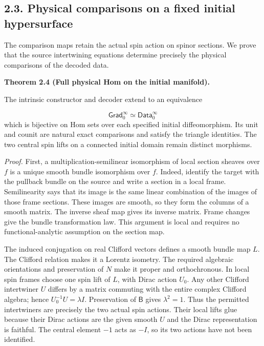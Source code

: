 \documentclass[
  english,
  11pt,
  reqno]{amsart}
\makeatletter
\newcommand{\pandocstatementheading}[1]{%
  \par\addpenalty{\@beginparpenalty}%
  \addvspace{.5\baselineskip plus .2\baselineskip minus .2\baselineskip}%
  {\normalfont\bfseries #1\par}%
  \nobreak\@afterindenttrue\@afterheading
}
\makeatother
\begin{document}
\subsection{2.3. Physical comparisons on a fixed initial
hypersurface}\label{physical-comparisons-on-a-fixed-initial-hypersurface}\label{sec:online-initial-physical-comparisons}

The comparison maps retain the actual spin action on spinor sections. We
prove that the source intertwining equations determine precisely the
physical comparisons of the decoded data.

\pandocstatementheading{\leavevmode{}\label{thm:online-initial-gradient-full-hom}Theorem 2.4 (Full physical Hom on the initial manifold).}

The intrinsic constructor and decoder extend to an equivalence

\label{eq:online-intrinsic-initial-equivalence} \[
\mathsf{Grad}_0^\infty\simeq\mathsf{Data}_0^\infty
\] which is bijective on Hom sets over each specified initial
diffeomorphism. Its unit and counit are natural exact comparisons and
satisfy the triangle identities. The two central spin lifts on a
connected initial domain remain distinct morphisms.

\emph{Proof.} First, a multiplication-semilinear isomorphism of local
section sheaves over \(f\) is a unique smooth bundle isomorphism over
\(f\). Indeed, identify the target with the pullback bundle on the
source and write a section in a local frame. Semilinearity says that its
image is the same linear combination of the images of those frame
sections. These images are smooth, so they form the columns of a smooth
matrix. The inverse sheaf map gives its inverse matrix. Frame changes
give the bundle transformation law. This argument is local and requires
no functional-analytic assumption on the section map.

The induced conjugation on real Clifford vectors defines a smooth bundle
map \(L\). The Clifford relation makes it a Lorentz isometry. The
required algebraic orientations and preservation of \(N\) make it proper
and orthochronous. In local spin frames choose one spin lift of \(L\),
with Dirac action \(U_0\). Any other Clifford intertwiner \(U\) differs
by a matrix commuting with the entire complex Clifford algebra; hence
\(U_0^{-1}U=\lambda I\). Preservation of \(\mathsf B\) gives
\(\lambda^2=1\). Thus the permitted intertwiners are precisely the two
actual spin actions. Their local lifts glue because their Dirac actions
are the given smooth \(U\) and the Dirac representation is faithful. The
central element \(-1\) acts as \(-I\), so its two actions have not been
identified.
\end{document}
